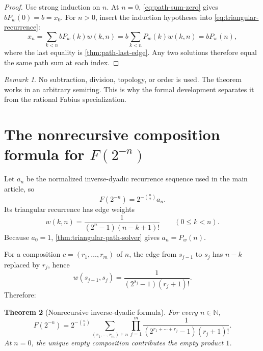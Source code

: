 \documentclass[11pt,oneside]{article}
\newtheorem{theorem}{Theorem}[section]
\theoremstyle{definition}
\theoremstyle{remark}
\newtheorem{remark}[theorem]{Remark}
\newcommand{\N}{\mathbb N}
\begin{document}
\begin{proof}
Use strong induction on $n$.  At $n=0$, \eqref{eq:path-sum-zero} gives
$bP_w(0)=b=x_0$.  For $n>0$, insert the induction hypotheses into
\eqref{eq:triangular-recurrence}:
\[
 x_n=\sum_{k<n}bP_w(k)w(k,n)
 =b\sum_{k<n}P_w(k)w(k,n)
 =bP_w(n),
\]
where the last equality is \cref{thm:path-last-edge}.  Any two solutions therefore equal the
same path sum at each index.
\end{proof}

\begin{remark}
No subtraction, division, topology, or order is used.  The theorem works in an arbitrary
semiring.  This is why the formal development separates it from the rational Fabius
specialization.
\end{remark}

\section{The nonrecursive composition formula for \texorpdfstring{$F(2^{-n})$}{F(2 to the -n)}}
\label{sec:fabius-composition-formula}

Let $a_n$ be the normalized inverse-dyadic recurrence sequence used in the main article, so
\begin{equation}
 F(2^{-n})=2^{-\binom n2}a_n.
 \label{eq:inverse-dyadic-normalization}
\end{equation}
Its triangular recurrence has edge weights
\begin{equation}
 w(k,n)=\frac{1}{(2^n-1)(n-k+1)!}
 \qquad(0\le k<n).
 \label{eq:fabius-recurrence-edge}
\end{equation}
Because $a_0=1$, \cref{thm:triangular-path-solver} gives $a_n=P_w(n)$.

For a composition $c=(r_1,\ldots,r_m)$ of $n$, the edge from $s_{j-1}$ to $s_j$ has
$n-k$ replaced by $r_j$, hence
\begin{equation}
 w(s_{j-1},s_j)=\frac{1}{(2^{s_j}-1)(r_j+1)!}.
 \label{eq:fabius-composition-edge}
\end{equation}
Therefore:

\begin{theorem}[Nonrecursive inverse-dyadic formula]
\label{thm:composition-inverse-dyadic}
For every $n\in\N$,
\begin{equation}
 F(2^{-n})=
 2^{-\binom n2}
 \sum_{(r_1,\ldots,r_m)\models n}
 \prod_{j=1}^{m}
 \frac{1}{(2^{r_1+\cdots+r_j}-1)(r_j+1)!}.
 \label{eq:composition-inverse-dyadic}
\end{equation}
At $n=0$, the unique empty composition contributes the empty product $1$.
\end{theorem}
\end{document}
